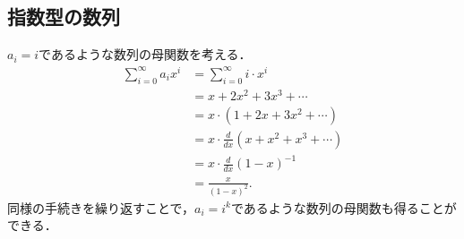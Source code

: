 \documentclass{jsarticle}
\begin{document}
\subsection{指数型の数列}
$a_i = i$であるような数列の母関数を考える．
\begin{align*}
  \sum_{i=0}^\infty a_i x^i &= \sum_{i=0}^\infty i\cdot x^i\\
  &= x + 2x^2 + 3x^3 + \cdots\\
  &= x \cdot (1 + 2x + 3x^2 + \cdots)\\
  &= x \cdot \frac{d}{dx}(x + x^2 + x^3 + \cdots)\\
  &= x \cdot \frac{d}{dx} (1-x)^{-1}\\
  &= \frac{x}{(1-x)^2}.
\end{align*}
同様の手続きを繰り返すことで，$a_i = i^k$であるような数列の母関数も得ることができる．
\end{document}
